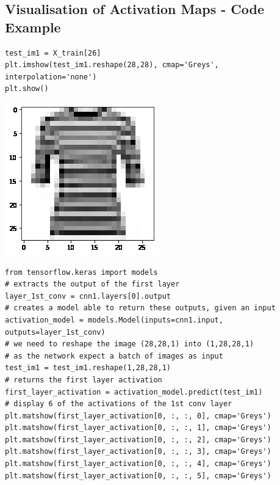 \documentclass[11pt]{article}
\begin{document}
\subsection{Visualisation of Activation Maps - Code Example}
\begin{minipage}{0.8\linewidth}
	\begin{verbatim}
test_im1 = X_train[26]
plt.imshow(test_im1.reshape(28,28), cmap='Greys', interpolation='none')
plt.show()
	\end{verbatim}
\end{minipage}
\begin{minipage}{0.2\linewidth}
	\begin{center}
		\includegraphics[width=\linewidth]{img/activation_maps_input}
	\end{center}
\end{minipage}

\begin{verbatim}
from tensorflow.keras import models
# extracts the output of the first layer
layer_1st_conv = cnn1.layers[0].output
# creates a model able to return these outputs, given an input
activation_model = models.Model(inputs=cnn1.input, outputs=layer_1st_conv)
# we need to reshape the image (28,28,1) into (1,28,28,1)
# as the network expect a batch of images as input
test_im1 = test_im1.reshape(1,28,28,1)
# returns the first layer activation
first_layer_activation = activation_model.predict(test_im1)
# display 6 of the activations of the 1st conv layer
plt.matshow(first_layer_activation[0, :, :, 0], cmap='Greys')
plt.matshow(first_layer_activation[0, :, :, 1], cmap='Greys')
plt.matshow(first_layer_activation[0, :, :, 2], cmap='Greys')
plt.matshow(first_layer_activation[0, :, :, 3], cmap='Greys')
plt.matshow(first_layer_activation[0, :, :, 4], cmap='Greys')
plt.matshow(first_layer_activation[0, :, :, 5], cmap='Greys')
\end{verbatim}
\end{document}
